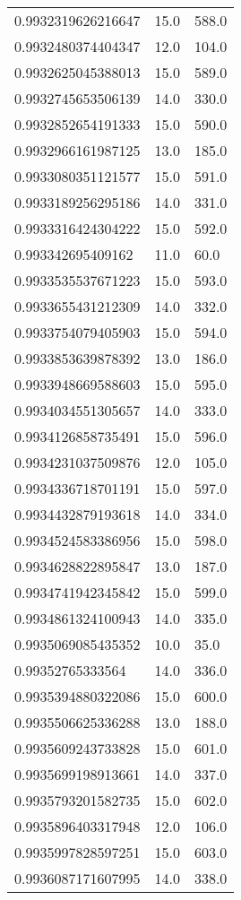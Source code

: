 \begin{center}
\begin{supertabular}[H]{p{0.30\textwidth}p{0.05\textwidth}p{0.05\textwidth}}
0.9932319626216647 & 15.0 & 588.0 \\ 
0.9932480374404347 & 12.0 & 104.0 \\ 
0.9932625045388013 & 15.0 & 589.0 \\ 
0.9932745653506139 & 14.0 & 330.0 \\ 
0.9932852654191333 & 15.0 & 590.0 \\ 
0.9932966161987125 & 13.0 & 185.0 \\ 
0.9933080351121577 & 15.0 & 591.0 \\ 
0.9933189256295186 & 14.0 & 331.0 \\ 
0.9933316424304222 & 15.0 & 592.0 \\ 
0.993342695409162 & 11.0 & 60.0 \\ 
0.9933535537671223 & 15.0 & 593.0 \\ 
0.9933655431212309 & 14.0 & 332.0 \\ 
0.9933754079405903 & 15.0 & 594.0 \\ 
0.9933853639878392 & 13.0 & 186.0 \\ 
0.9933948669588603 & 15.0 & 595.0 \\ 
0.9934034551305657 & 14.0 & 333.0 \\ 
0.9934126858735491 & 15.0 & 596.0 \\ 
0.9934231037509876 & 12.0 & 105.0 \\ 
0.9934336718701191 & 15.0 & 597.0 \\ 
0.9934432879193618 & 14.0 & 334.0 \\ 
0.9934524583386956 & 15.0 & 598.0 \\ 
0.9934628822895847 & 13.0 & 187.0 \\ 
0.9934741942345842 & 15.0 & 599.0 \\ 
0.9934861324100943 & 14.0 & 335.0 \\ 
0.9935069085435352 & 10.0 & 35.0 \\ 
0.99352765333564 & 14.0 & 336.0 \\ 
0.9935394880322086 & 15.0 & 600.0 \\ 
0.9935506625336288 & 13.0 & 188.0 \\ 
0.9935609243733828 & 15.0 & 601.0 \\ 
0.9935699198913661 & 14.0 & 337.0 \\ 
0.9935793201582735 & 15.0 & 602.0 \\ 
0.9935896403317948 & 12.0 & 106.0 \\ 
0.9935997828597251 & 15.0 & 603.0 \\ 
0.9936087171607995 & 14.0 & 338.0 \\ 

\end{supertabular}
\end{center}
